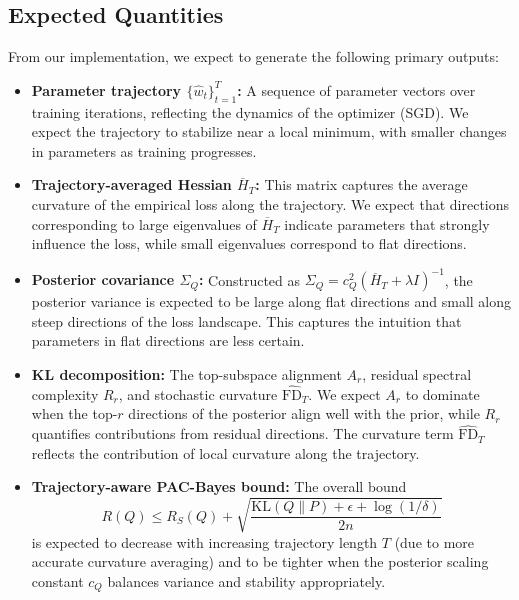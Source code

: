 \subsection{Expected Quantities}

From our implementation, we expect to generate the following primary outputs:

\begin{itemize}[noitemsep]
    \item \textbf{Parameter trajectory $\{\widehat w_t\}_{t=1}^T$:} A sequence of parameter vectors over training iterations, reflecting the dynamics of the optimizer (SGD). We expect the trajectory to stabilize near a local minimum, with smaller changes in parameters as training progresses.
    
    \item \textbf{Trajectory-averaged Hessian $\overline H_T$:} This matrix captures the average curvature of the empirical loss along the trajectory. We expect that directions corresponding to large eigenvalues of $\overline H_T$ indicate parameters that strongly influence the loss, while small eigenvalues correspond to flat directions.
    
    \item \textbf{Posterior covariance $\Sigma_Q$:} Constructed as $\Sigma_Q = c_Q^2 (\overline H_T + \lambda I)^{-1}$, the posterior variance is expected to be large along flat directions and small along steep directions of the loss landscape. This captures the intuition that parameters in flat directions are less certain.
    
    \item \textbf{KL decomposition:} The top-subspace alignment $A_r$, residual spectral complexity $R_r$, and stochastic curvature $\widehat{\mathrm{FD}}_T$. We expect $A_r$ to dominate when the top-$r$ directions of the posterior align well with the prior, while $R_r$ quantifies contributions from residual directions. The curvature term $\widehat{\mathrm{FD}}_T$ reflects the contribution of local curvature along the trajectory.
    
    \item \textbf{Trajectory-aware PAC-Bayes bound:} The overall bound
    \[
    R(Q) \le R_S(Q) + \sqrt{\frac{\mathrm{KL}(Q\|P) + \epsilon + \log(1/\delta)}{2n}}
    \]
    is expected to decrease with increasing trajectory length $T$ (due to more accurate curvature averaging) and to be tighter when the posterior scaling constant $c_Q$ balances variance and stability appropriately.
\end{itemize}


